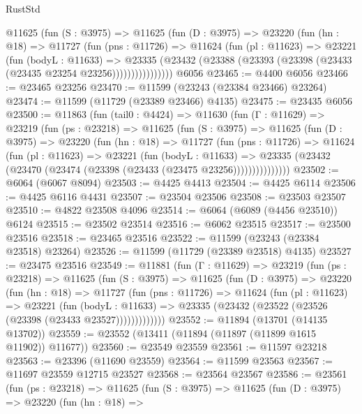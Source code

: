 \begin{lexlean}{RustStd}
\begin{coremodule}
          @11625
            (fun (S : @3975) =>
            @11625
              (fun (D : @3975) =>
              @23220
                (fun (hn : @18) =>
                @11727
                  (fun (pns : @11726) =>
                  @11624
                    (fun (pl : @11623) =>
                    @23221
                      (fun (bodyL : @11633) =>
                      @23335
                        (@23432
                          (@23388 (@23393 (@23398 (@23433 (@23435 @23254 @23256))))))))))))))))
    @6056
@23465 := @4400 @6056
@23466 := @23465 @23256
@23470 := @11599 (@23243 (@23384 @23466) @23264)
@23474 := @11599 (@11729 (@23389 @23466) @4135)
@23475 := @23435 @6056
@23500 := @11863
    (fun (tail0 : @4424) =>
    @11630
      (fun (Γ : @11629) =>
      @23219
        (fun (ps : @23218) =>
        @11625
          (fun (S : @3975) =>
          @11625
            (fun (D : @3975) =>
            @23220
              (fun (hn : @18) =>
              @11727
                (fun (pns : @11726) =>
                @11624
                  (fun (pl : @11623) =>
                  @23221
                    (fun (bodyL : @11633) =>
                    @23335 (@23432 (@23470 (@23474 (@23398 (@23433 (@23475 @23256)))))))))))))))
@23502 := @6064 (@6067 @8094)
@23503 := @4425 @4413
@23504 := @4425 @6114
@23506 := @4425 @6116 @4431
@23507 := @23504 @23506
@23508 := @23503 @23507
@23510 := @4822 @23508 @4096
@23514 := @6064 (@6089 (@4456 @23510)) @6124
@23515 := @23502 @23514
@23516 := @6062 @23515
@23517 := @23500 @23516
@23518 := @23465 @23516
@23522 := @11599 (@23243 (@23384 @23518) @23264)
@23526 := @11599 (@11729 (@23389 @23518) @4135)
@23527 := @23475 @23516
@23549 := @11881
    (fun (Γ : @11629) =>
    @23219
      (fun (ps : @23218) =>
      @11625
        (fun (S : @3975) =>
        @11625
          (fun (D : @3975) =>
          @23220
            (fun (hn : @18) =>
            @11727
              (fun (pns : @11726) =>
              @11624
                (fun (pl : @11623) =>
                @23221
                  (fun (bodyL : @11633) =>
                  @23335 (@23432 (@23522 (@23526 (@23398 (@23433 @23527)))))))))))))
@23552 := @11894 (@13701 (@14135 @13702))
@23559 := @23552 (@13411 (@11894 (@11897 (@11899 @1615 @11902)) @11677))
@23560 := @23549 @23559
@23561 := @11597 @23218
@23563 := @23396 (@11690 @23559)
@23564 := @11599 @23563
@23567 := @11697 @23559 @12715 @23527
@23568 := @23564 @23567
@23586 := @23561
    (fun (ps : @23218) =>
    @11625
      (fun (S : @3975) =>
      @11625
        (fun (D : @3975) =>
        @23220
          (fun (hn : @18) =>

\end{coremodule}
\end{lexlean}
